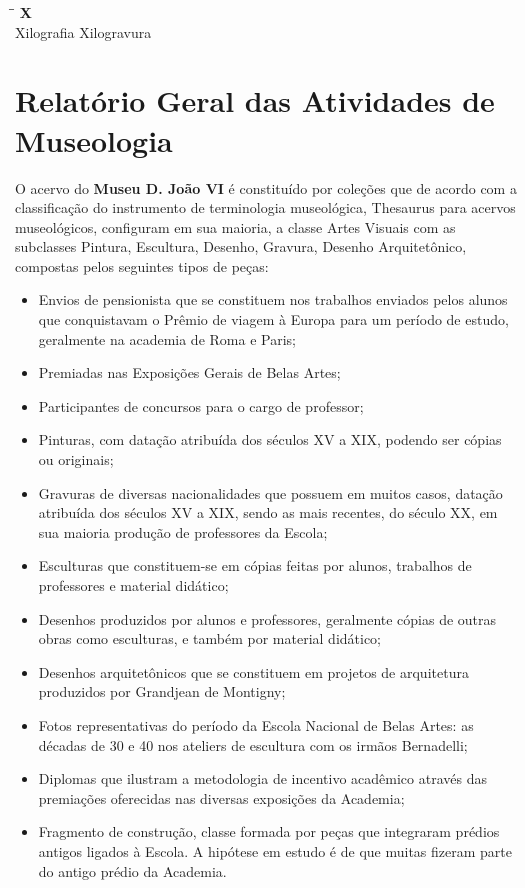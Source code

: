 \begin{tabbing}
	\hspace{8,7cm}\=\hspace{1cm}\=\kill
	\textbf{X} \>  \\ 
	Xilografia \> Xilogravura\\
\end{tabbing}

\section{Relatório Geral das Atividades de Museologia}

O acervo do \textbf{Museu D. João VI} é constituído por coleções que de acordo com a classificação do instrumento de terminologia museológica, Thesaurus para acervos museológicos, configuram em sua maioria, a classe Artes Visuais com as subclasses Pintura, Escultura, Desenho, Gravura, Desenho Arquitetônico, compostas pelos seguintes tipos de peças:

\begin{itemize}
	\item Envios de pensionista que se constituem nos trabalhos enviados pelos alunos que conquistavam o Prêmio de viagem à Europa para um período de estudo, geralmente na academia de Roma e Paris;
	\item Premiadas nas Exposições Gerais de Belas Artes;
	\item Participantes de concursos para o cargo de professor;
	\item Pinturas, com datação atribuída dos séculos XV a XIX, podendo ser cópias ou originais;
	\item Gravuras de diversas nacionalidades que possuem em muitos casos, datação atribuída dos séculos XV a XIX, sendo as mais recentes, do século XX, em sua maioria produção de professores da Escola;
	\item Esculturas que constituem-se em cópias feitas por alunos, trabalhos de professores e material didático;
	\item Desenhos produzidos por alunos e professores, geralmente cópias de outras obras como esculturas, e também por material didático;
	\item Desenhos arquitetônicos que se constituem em projetos de arquitetura produzidos por Grandjean de Montigny;
	\item Fotos representativas do período da Escola Nacional de Belas Artes: as décadas de 30 e 40 nos ateliers de escultura com os irmãos Bernadelli;
	\item Diplomas que ilustram a metodologia de incentivo acadêmico através das premiações oferecidas nas diversas exposições da Academia;
	\item Fragmento de construção, classe formada por peças que integraram prédios antigos ligados à Escola. A hipótese em estudo é de que muitas fizeram	parte do antigo prédio da Academia.
\end{itemize}

